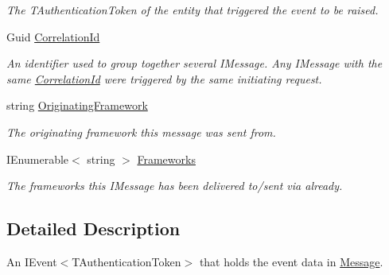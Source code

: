 \begin{DoxyCompactItemize}
\begin{DoxyCompactList}\small\item\em The {\itshape T\+Authentication\+Token}  of the entity that triggered the event to be raised. \end{DoxyCompactList}\item 
Guid \hyperlink{classCqrs_1_1EventStore_1_1SimpleEvent_aa96b900b0fef8e6b2f6af81b5ce99f16_aa96b900b0fef8e6b2f6af81b5ce99f16}{Correlation\+Id}
\begin{DoxyCompactList}\small\item\em An identifier used to group together several I\+Message. Any I\+Message with the same \hyperlink{classCqrs_1_1EventStore_1_1SimpleEvent_aa96b900b0fef8e6b2f6af81b5ce99f16_aa96b900b0fef8e6b2f6af81b5ce99f16}{Correlation\+Id} were triggered by the same initiating request. \end{DoxyCompactList}\item 
string \hyperlink{classCqrs_1_1EventStore_1_1SimpleEvent_a3b365c5f9a7ee4491e01a463dca178b7_a3b365c5f9a7ee4491e01a463dca178b7}{Originating\+Framework}
\begin{DoxyCompactList}\small\item\em The originating framework this message was sent from. \end{DoxyCompactList}\item 
I\+Enumerable$<$ string $>$ \hyperlink{classCqrs_1_1EventStore_1_1SimpleEvent_ac9f0b878d05f7a3fde9560ae9477c9ec_ac9f0b878d05f7a3fde9560ae9477c9ec}{Frameworks}
\begin{DoxyCompactList}\small\item\em The frameworks this I\+Message has been delivered to/sent via already. \end{DoxyCompactList}\end{DoxyCompactItemize}


\subsection{Detailed Description}
An I\+Event$<$\+T\+Authentication\+Token$>$ that holds the event data in \hyperlink{classCqrs_1_1EventStore_1_1SimpleEvent_a4e07144de1cdb94bbbf1313eb0e1f35d_a4e07144de1cdb94bbbf1313eb0e1f35d}{Message}. 


